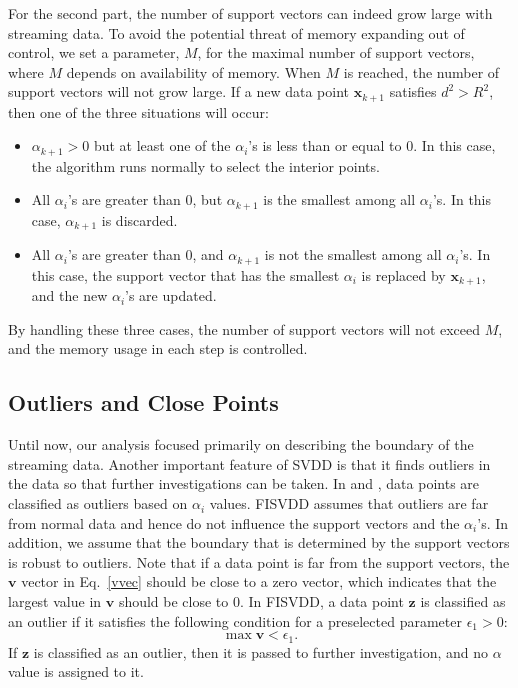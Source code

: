 \documentclass{article}
\newcommand{\eref}[1]{Eq.~\ref{#1}}
\numberwithin{equation}{section}
\begin{document}
For the second part, the number of support vectors can indeed grow large with streaming data. To avoid the potential threat of memory expanding out of control, we set a parameter, $M$, for the maximal number of support vectors, where $M$ depends on availability of memory. When $M$ is reached, the number of support vectors will not grow large. If a new data point $\mathbf{x}_{k+1}$ satisfies $d^2>R^2$, then one of the three situations will occur:
\begin{itemize}
\item $\alpha_{k+1}>0$ but at least one of the $\alpha_i$'s is less than or equal to 0. In this case, the algorithm runs normally to select the interior points.
\item All $\alpha_{i}$'s are greater than 0, but $\alpha_{k+1}$ is the smallest among all $\alpha_i$'s. In this case, $\alpha_{k+1}$ is discarded.
\item All $\alpha_{i}$'s are greater than 0, and $\alpha_{k+1}$ is not the smallest among all $\alpha_i$'s. In this case, the support vector that has the smallest $\alpha_{i}$ is replaced by $\mathbf{x}_{k+1}$, and the new $\alpha_i$'s are updated.
\end{itemize}

By handling these three cases, the number of support vectors will not exceed $M$, and the memory usage in each step is controlled. 


\subsection{Outliers and Close Points}\label{epsilon}
Until now, our analysis focused primarily on describing the boundary of the streaming data. Another important feature of SVDD is that it finds outliers in the data so that further investigations can be taken. In \cite{laskov2006incremental} and \cite{scheinberg2006efficient}, data points are classified as outliers based on $\alpha_i$ values. FISVDD assumes that outliers are far from normal data and hence do not influence the support vectors and the $\alpha_i$'s. In addition, we assume that the boundary that is determined by the support vectors is robust to outliers. Note that if a data point is far from the support vectors, the $\mathbf{v}$ vector in \eref{vvec} should be close to a zero vector, which indicates that the largest value in $\mathbf{v}$ should be close to 0. In FISVDD, a data point $\mathbf{z}$ is classified as an outlier if it satisfies the following condition for a preselected parameter $\epsilon_1>0$:
\begin{equation}\label{outlierdef}
\max{\mathbf{v}} < \epsilon_1.
\end{equation}
If $\mathbf{z}$ is classified as an outlier, then it is passed to further investigation, and no $\alpha$ value is assigned to it.
\end{document}
